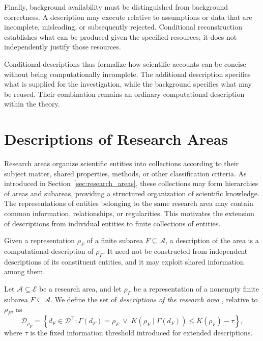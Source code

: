 Finally, background availability must be distinguished from background correctness. A description may execute relative to assumptions or data that are incomplete, misleading, or subsequently rejected. Conditional reconstruction establishes what can be produced given the specified resources; it does not independently justify those resources.

Conditional descriptions thus formalize how scientific accounts can be concise without being computationally incomplete. The additional description specifies what is supplied for the investigation, while the background specifies what may be reused. Their combination remains an ordinary computational description within the theory.

%
%

\section{Descriptions of Research Areas}
\label{sec:description_of_areas}

Research areas organize scientific entities into collections according to their subject matter, shared properties, methods, or other classification criteria. As introduced in Section~\ref{sec:research_areas}, these collections may form hierarchies of areas and subareas, providing a structured organization of scientific knowledge. The representations of entities belonging to the same research area may contain common information, relationships, or regularities. This motivates the extension of descriptions from individual entities to finite collections of entities.

Given a representation $\rho_F$ of a finite subarea $F\subseteq\mathcal A$, a description of the area is a computational description of $\rho_F$. It need not be constructed from independent descriptions of its constituent entities, and it may exploit shared information among them.

\begin{definition}
Let $\mathcal{A}\subseteq\mathcal{E}$ be a research area, and let $\rho_F$ be a representation of a nonempty finite subarea $F\subseteq\mathcal{A}$. We define the set of \emph{descriptions of the research area} , relative to $\rho_F$, as
\[
\mathcal{D}_{\rho_F} = \left\{d_F\in\mathcal{D}^{\top}: \Gamma(d_F)=\rho_F \;\lor\; 
K(\rho_F\mid\Gamma(d_F))\leq K(\rho_F)-\tau \right\},
\]
where $\tau$ is the fixed information threshold introduced for extended descriptions.
\end{definition}

